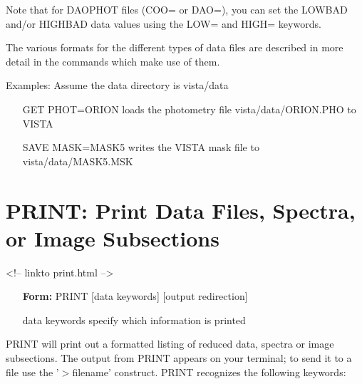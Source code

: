Note that for DAOPHOT files (COO= or DAO=), you can set the LOWBAD and/or
HIGHBAD data values using the LOW= and HIGH= keywords.

The various formats for the different types of data files are described in
more detail in the commands which make use of them.

Examples:  Assume the data directory is vista/data
\begin{itemize}
  \item[GET PHOT=ORION\hfill]{loads the photometry file
       vista/data/ORION.PHO to VISTA}
  \item[SAVE MASK=MASK5\hfill]{writes the VISTA mask file
       to vista/data/MASK5.MSK}
\end{itemize}


\section{PRINT: Print Data Files, Spectra, or Image Subsections}
\begin{rawhtml}
<!-- linkto print.html -->
\end{rawhtml}
\begin{itemize}
  \item[\textbf{Form: } PRINT {[data keywords]} {[output redirection]}\hfill]
  \item[data keywords]{specify which information is printed}
\end{itemize}

PRINT will print out a formatted listing of reduced data, spectra or image
subsections.  The output from PRINT appears on your terminal; to send it to
a file use the '$>$filename' construct.  PRINT recognizes the following
keywords:

